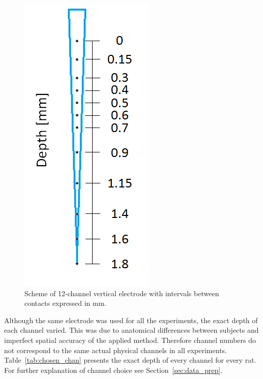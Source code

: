 \documentclass{pracalicmgr}
\begin{document}
   \begin{figure}[H]
   	\begin{center}
   		\includegraphics[scale=0.5]{electrode.png}
   	\end{center}
   	\caption{Scheme of 12-channel vertical electrode with intervals between contacts expressed in mm.}
   	\label{rys:electrode}
   \end{figure}
   Although the same electrode was used for all the experiments, the exact depth of each channel varied. This was due to anatomical differences between subjects and imperfect spatial accuracy of the applied method. Therefore channel numbers do not correspond to the same actual physical channels in all experiments. Table~\ref{tab:chosen_chan} presents the exact depth of every channel for every rat. For further explanation of channel choice see Section~\ref{sec:data_prep}.
\end{document}
